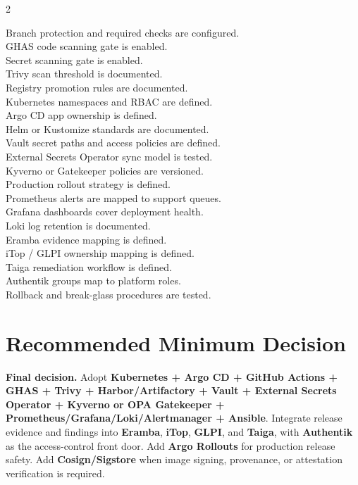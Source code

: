 \documentclass[10pt,letterpaper]{article}
\newcommand{\checkbox}{\makebox[1.2em][l]{\(\square\)}}
\newcommand{\tool}[1]{\textbf{#1}}
\begin{document}
\begin{multicols}{2}
\raggedright
\checkbox Branch protection and required checks are configured.\\
\checkbox GHAS code scanning gate is enabled.\\
\checkbox Secret scanning gate is enabled.\\
\checkbox Trivy scan threshold is documented.\\
\checkbox Registry promotion rules are documented.\\
\checkbox Kubernetes namespaces and RBAC are defined.\\
\checkbox Argo CD app ownership is defined.\\
\checkbox Helm or Kustomize standards are documented.\\
\checkbox Vault secret paths and access policies are defined.\\
\checkbox External Secrets Operator sync model is tested.\\
\checkbox Kyverno or Gatekeeper policies are versioned.\\
\checkbox Production rollout strategy is defined.\\
\checkbox Prometheus alerts are mapped to support queues.\\
\checkbox Grafana dashboards cover deployment health.\\
\checkbox Loki log retention is documented.\\
\checkbox Eramba evidence mapping is defined.\\
\checkbox iTop / GLPI ownership mapping is defined.\\
\checkbox Taiga remediation workflow is defined.\\
\checkbox Authentik groups map to platform roles.\\
\checkbox Rollback and break-glass procedures are tested.\\
\end{multicols}

\section{Recommended Minimum Decision}

\begin{riskbox}
\textbf{Final decision.} Adopt \tool{Kubernetes + Argo CD + GitHub Actions + GHAS + Trivy + Harbor/Artifactory + Vault + External Secrets Operator + Kyverno or OPA Gatekeeper + Prometheus/Grafana/Loki/Alertmanager + Ansible}. Integrate release evidence and findings into \tool{Eramba}, \tool{iTop}, \tool{GLPI}, and \tool{Taiga}, with \tool{Authentik} as the access-control front door. Add \tool{Argo Rollouts} for production release safety. Add \tool{Cosign/Sigstore} when image signing, provenance, or attestation verification is required.
\end{riskbox}
\end{document}

